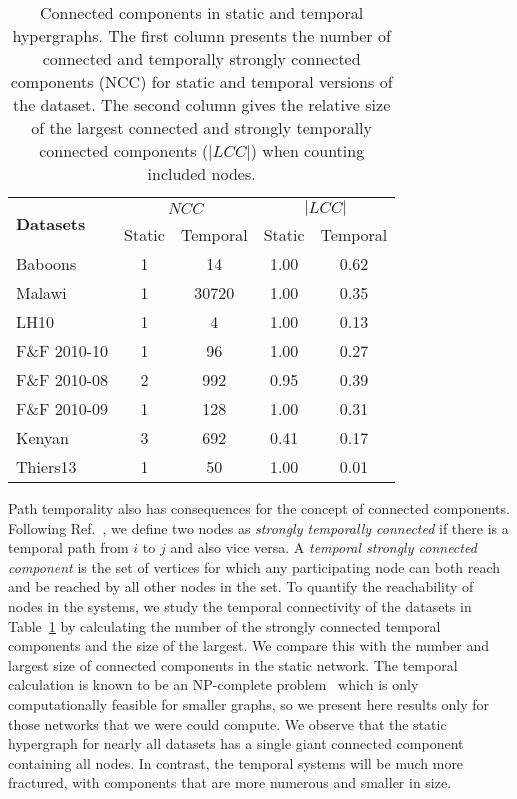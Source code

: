 \documentclass[a4paper,pre,reqno,superscriptaddress, twocolumn, floatfix]{revtex4}
\begin{document}
\begin{table}[h!]
\begin{tabular}{l|cc|cc}
\hline
\multirow{2}{*}{\textbf{Datasets}} & \multicolumn{2}{c|}{{$NCC$}} & \multicolumn{2}{c}{{$|LCC|$}} \\
\cline{2-5}
 & Static & Temporal & Static & Temporal \\
\hline
Baboons & 1 & 14  & 1.00  & 0.62  \\
Malawi  & 1 & 30720 & 1.00  & 0.35 \\
LH10  & 1 & 4   & 1.00  & 0.13 \\
F\&F 2010-10 & 1 & 96  & 1.00 & 0.27 \\
F\&F 2010-08 & 2 & 992   & 0.95  & 0.39 \\
F\&F 2010-09 & 1 & 128   & 1.00  & 0.31 \\
Kenyan  & 3 & 692   & 0.41  & 0.17 \\
Thiers13   & 1 & 50  & 1.00 & 0.01  \\
\hline
\end{tabular}
\caption{ \justifying
Connected components in static and temporal hypergraphs. 
The first column presents the number of connected and temporally strongly connected components (NCC) for static and temporal versions of the dataset. The second column gives the relative size of the largest connected and strongly temporally connected components ($|LCC|$) when counting included nodes.
}
\label{tbl:conncomps}
\end{table}

Path temporality also has consequences for the concept of connected components. 
 Following Ref.~\cite{nicosia2012components}, we define two nodes as \textit{strongly temporally connected} if there is a temporal path from $i$ to $j$ and also vice versa. A \textit{temporal strongly connected component} is the set of vertices for which any participating node can both reach and be reached by all other nodes in the set. 
 To quantify the reachability of nodes in the systems, we study the temporal connectivity of the datasets in Table~\ref{tbl:conncomps} by calculating the number of the strongly connected temporal components and the size of the largest. We compare this with the number and largest size of connected components in the static network. The temporal calculation is known to be an NP-complete problem~\cite{nicosia2013graphmetrics} which is only computationally feasible for smaller graphs, so we present here results only for those networks that we were could compute. We observe that the static hypergraph for nearly all datasets has a single giant connected component containing all nodes. In contrast, the temporal systems will be much more fractured, with components that are more numerous and smaller in size. 
\end{document}
